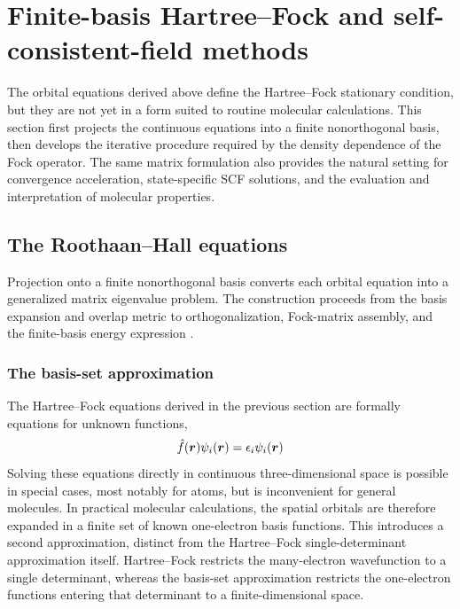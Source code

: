 \documentclass[11pt,a4paper,titlepage]{article}
\numberwithin{equation}{section}
\newcommand{\br}{\boldsymbol{r}}
\newcommand{\hf}{\Hat{f}}
\begin{document}
\section{Finite-basis Hartree--Fock and self-consistent-field methods}
\label{sec:finite-basis-hf}

The orbital equations derived above define the Hartree--Fock stationary
condition, but they are not yet in a form suited to routine molecular
calculations. This section first projects the continuous equations into a
finite nonorthogonal basis, then develops the iterative procedure required by
the density dependence of the Fock operator. The same matrix formulation also
provides the natural setting for convergence acceleration, state-specific SCF
solutions, and the evaluation and interpretation of molecular properties.

\subsection{The Roothaan--Hall equations}

Projection onto a finite nonorthogonal basis converts each orbital equation
into a generalized matrix eigenvalue problem. The construction proceeds from
the basis expansion and overlap metric to orthogonalization, Fock-matrix
assembly, and the finite-basis energy expression
\citep{Roothaan1951,Hall1951}.

\hfBioRoothaan
\hfBioHall

\subsubsection{The basis-set approximation}

The Hartree--Fock equations derived in the previous section are formally
equations for unknown functions,
\begin{equation}
  \hf(\br)\psi_i(\br)
  =
  \epsilon_i\psi_i(\br)
  \label{eq:hf-continuous}
\end{equation}
Solving these equations directly in continuous three-dimensional space is
possible in special cases, most notably for atoms, but is inconvenient for
general molecules. In practical molecular calculations, the spatial
orbitals are therefore expanded in a finite set of known one-electron basis
functions.
This introduces a second approximation, distinct from the Hartree--Fock
single-determinant approximation itself. Hartree--Fock restricts the
many-electron wavefunction to a single determinant, whereas the
basis-set approximation restricts the one-electron functions entering
that determinant to a finite-dimensional space.
\end{document}
